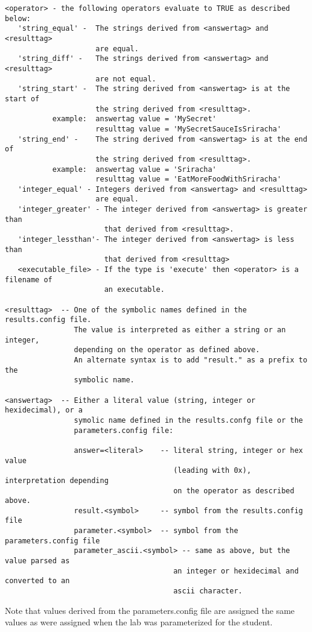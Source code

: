 \documentclass[12pt]{article}
\begin{document}
\begin{verbatim}
<operator> - the following operators evaluate to TRUE as described below:
   'string_equal' -  The strings derived from <answertag> and <resulttag>
                     are equal.
   'string_diff' -   The strings derived from <answertag> and <resulttag>
                     are not equal.
   'string_start' -  The string derived from <answertag> is at the start of 
                     the string derived from <resulttag>.
           example:  answertag value = 'MySecret'
                     resulttag value = 'MySecretSauceIsSriracha'
   'string_end' -    The string derived from <answertag> is at the end of
                     the string derived from <resulttag>.
           example:  answertag value = 'Sriracha'
                     resulttag value = 'EatMoreFoodWithSriracha'
   'integer_equal' - Integers derived from <answertag> and <resulttag>
                     are equal.
   'integer_greater' - The integer derived from <answertag> is greater than
                       that derived from <resulttag>.
   'integer_lessthan'- The integer derived from <answertag> is less than
                       that derived from <resulttag>
   <executable_file> - If the type is 'execute' then <operator> is a filename of 
                       an executable.
             
<resulttag>  -- One of the symbolic names defined in the results.config file.
                The value is interpreted as either a string or an integer,
                depending on the operator as defined above. 
                An alternate syntax is to add "result." as a prefix to the
                symbolic name.
       
<answertag>  -- Either a literal value (string, integer or hexidecimal), or a 
                symolic name defined in the results.confg file or the 
                parameters.config file:
 
                answer=<literal>    -- literal string, integer or hex value 
                                       (leading with 0x), interpretation depending 
                                       on the operator as described above.
                result.<symbol>     -- symbol from the results.config file
                parameter.<symbol>  -- symbol from the parameters.config file
                parameter_ascii.<symbol> -- same as above, but the value parsed as 
                                       an integer or hexidecimal and converted to an 
                                       ascii character.

\end{verbatim}
         Note that values derived from the parameters.config file are assigned the same values as
         were assigned when the lab was parameterized for the student.
\end{document}
